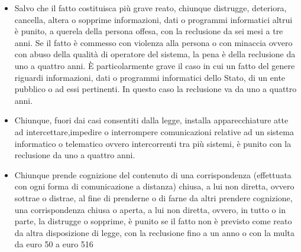\begin{itemize}
    \item Salvo che il fatto costituisca più grave reato, chiunque distrugge,
        deteriora, cancella, altera o sopprime informazioni, dati o programmi
        informatici altrui è punito, a querela della persona offesa, con la
        reclusione da sei mesi a tre anni. Se il fatto è commesso con violenza
        alla persona o con minaccia ovvero con abuso della qualità di operatore
        del sistema, la pena è della reclusione da uno a quattro anni.
        \newline È particolarmente grave il caso in cui un fatto del genere
        riguardi informazioni, dati o programmi informatici dello Stato, di un
        ente pubblico o ad essi pertinenti. In questo caso la reclusione va da
        uno a quattro anni.
    \item Chiunque, fuori dai casi consentiti dalla legge, installa
        apparecchiature atte ad intercettare,impedire o interrompere
        comunicazioni relative ad un sistema informatico o telematico ovvero
        intercorrenti tra più sistemi, è punito con la reclusione da uno a
        quattro anni. 
    \item Chiunque prende cognizione del contenuto di una corrispondenza
        (effettuata con ogni forma di comunicazione a distanza) chiusa, a lui
        non diretta, ovvero sottrae o distrae, al fine di prenderne o di farne
        da altri prendere cognizione, una corrispondenza chiusa o aperta, a lui
        non diretta, ovvero, in tutto o in parte, la distrugge o sopprime, è
        punito se il fatto non è previsto come reato da altra disposizione di
        legge, con la reclusione fino a un anno o con la multa da euro 50 a
        euro 516
\end{itemize}
